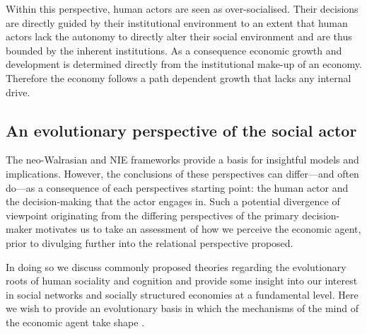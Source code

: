Within this perspective, human actors are seen as over-socialised. Their decisions are directly guided by their institutional environment to an extent that human actors lack the autonomy to directly alter their social environment and are thus bounded by the inherent institutions. As a consequence economic growth and development is determined directly from the institutional make-up of an economy. Therefore the economy follows a path dependent growth that lacks any internal drive.

\subsection{An evolutionary perspective of the social actor}

The neo-Walrasian and NIE frameworks provide a basis for insightful models and implications. However, the conclusions of these perspectives can differ---and often do---as a consequence of each perspectives starting point: the human actor and the decision-making that the actor engages in. Such a potential divergence of viewpoint originating from the differing perspectives of the primary decision-maker motivates us to take an assessment of how we perceive the economic agent, prior to divulging further into the relational perspective proposed.




In doing so we discuss commonly proposed theories regarding the evolutionary roots of human sociality and cognition and provide some insight into our interest in social networks and socially structured economies at a fundamental level. Here we wish to provide an evolutionary basis in which the mechanisms of the mind of the economic agent take shape \citep{Pinker1997}. 

